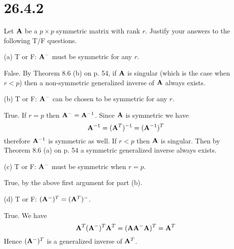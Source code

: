 \section*{26.4.2}
Let $\bf A$ be a $p\times p$ symmetric matrix with rank $r$.
Justify your answers to the following T/F questions.

\bigskip
\noindent
(a) T or F: ${\bf A}^{-{}}$ must be symmetric for any $r$.

\bigskip
\noindent
False. By Theorem 8.6 (b) on p. 54,
if $\bf A$ is singular (which is the case
when $r<p$) then a non-symmetric generalized inverse of $\bf A$
always exists.

\bigskip
\noindent
(b) T or F: ${\bf A}^{-{}}$ can be chosen to be symmetric for
any $r$.

\bigskip
\noindent
True. If $r=p$ then ${\bf A}^{-{}}={\bf A}^{-1}$.
Since $\bf A$ is symmetric we have
$${\bf A}^{-1}=({\bf A}^T)^{-1}=({\bf A}^{-1})^T$$
therefore ${\bf A}^{-1}$ is symmetric as well.
If $r<p$ then $\bf A$ is singular.
Then by Theorem 8.6 (a) on p. 54
a symmetric generalized inverse always exists.

\bigskip
\noindent
(c) T or F: ${\bf A}^{-{}}$ must be symmetric when $r=p$.

\bigskip
\noindent
True, by the above first argument for part (b).

\bigskip
\noindent
(d) T or F: $({\bf A}^{-{}})^T=({\bf A}^T)^{-{}}$.

\bigskip
\noindent
True. We have
$${\bf A}^T({\bf A}^{-{}})^T{\bf A}^T
=({\bf AA}^{-{}}{\bf A})^T={\bf A}^T$$
Hence $({\bf A}^{-{}})^T$ is a generalized inverse of ${\bf A}^T$.

